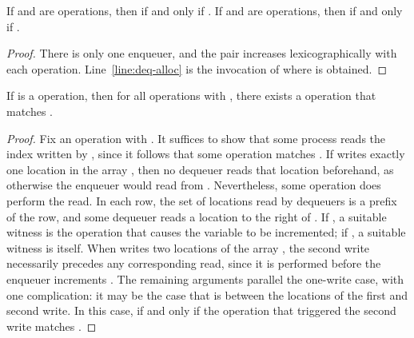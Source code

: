 \begin{lemma}
\label{lemma:loc-order}
If  and  are  operations, 
then  if and only if . 
If  and  are  operations, 
then  
if and only if . 
\end{lemma}
\begin{proof}
There is only one enqueuer, 
and the pair  
increases lexicographically with each  operation. 
Line~\ref{line:deq-alloc} is the invocation of  
where  is obtained. 
\end{proof}

\begin{lemma}
\label{lemma:complete}
If  is a  operation, 
then for all  operations  
with , 
there exists a  operation  
that matches . 
\end{lemma}
\begin{proof}
Fix an  operation  with . 
It suffices to show that some process reads the index written by , 
since it follows that some  operation matches . 
If  writes exactly one location  
in the array , 
then no dequeuer reads that location beforehand, 
as otherwise the enqueuer would read  
from . 
Nevertheless, some  operation does perform the read. 
In each row, 
the set of locations read by dequeuers is a prefix of the row, 
and some dequeuer reads a location to the right of . 
If , 
a suitable witness is the  operation 
that causes the variable  to be incremented; 
if , a suitable witness is  itself. 
When  writes two locations of the array , 
the second write necessarily precedes any corresponding read, 
since it is performed before the enqueuer increments . 
The remaining arguments parallel the one-write case, 
with one complication: 
it may be the case that  is between 
the locations of the first and second write. 
In this case,  if and only if 
the  operation that triggered the second write matches . 
\end{proof}

